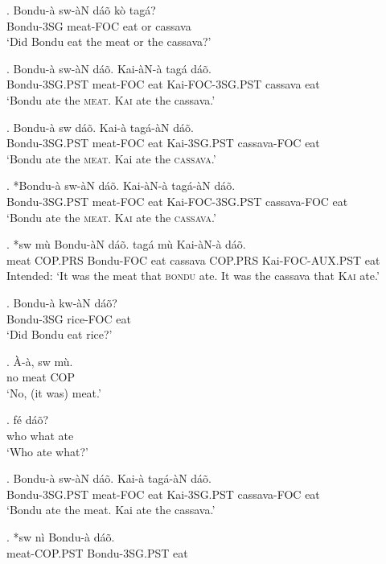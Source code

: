 \documentclass{assets/fieldnotes}
\begin{document}
\exg. Bondu-à sw-àN dáõ kò tagá?\\
Bondu-3SG meat-FOC eat or cassava\\
`Did Bondu eat the meat or the cassava?'

\exg. Bondu-à sw-àN dáõ. Kai-àN-à tagá dáõ.\\
Bondu-3SG.PST meat-FOC eat Kai-FOC-3SG.PST cassava eat\\
`Bondu ate the \textsc{meat}. \textsc{Kai} ate the cassava.'

\exg. Bondu-à sw dáõ. Kai-à tagá-àN dáõ.\\
Bondu-3SG.PST meat-FOC eat Kai-3SG.PST cassava-FOC eat\\
`Bondu ate the \textsc{meat}. Kai ate the \textsc{cassava}.'

\exg. *Bondu-à sw-àN dáõ. Kai-àN-à tagá-àN dáõ.\\
Bondu-3SG.PST meat-FOC eat Kai-FOC-3SG.PST cassava-FOC eat\\
`Bondu ate the \textsc{meat}. \textsc{Kai} ate the \textsc{cassava}.'

\exg. *sw mù Bondu-àN dáõ. tagá mù Kai-àN-à dáõ.\\
meat COP.PRS Bondu-FOC eat cassava COP.PRS Kai-FOC-AUX.PST eat\\
Intended: `It was the meat that \textsc{bondu} ate. It was the cassava that \textsc{Kai} ate.'

\exg. Bondu-à kw-àN dáõ?\\
Bondu-3SG rice-FOC eat\\
`Did Bondu eat rice?'

\exg. À-à, sw mù.\\
no meat COP\\
`No, (it was) meat.'

\exg.  fé dáõ?\\
who what ate\\
`Who ate what?'

\exg. Bondu-à sw-àN dáõ. Kai-à tagá-àN dáõ.\\
Bondu-3SG.PST meat-FOC eat Kai-3SG.PST cassava-FOC eat\\
`Bondu ate the meat. Kai ate the cassava.'

\exg. *sw nì Bondu-à dáõ.\\
meat-COP.PST Bondu-3SG.PST eat\\
\end{document}
